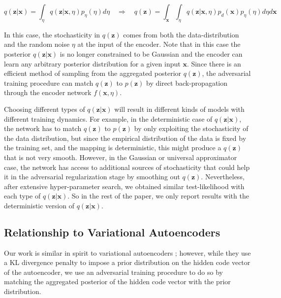 \documentclass{article}
\begin{document}
\vspace{-.2cm}

$$
q(\mathbf{z}|\mathbf{x}) = \int_\eta q(\mathbf{z}|\mathbf{x},\eta) p_{\eta}(\eta) d\eta \quad \Rightarrow  \quad q(\mathbf{z}) = \int_\mathbf{x} \int_\eta q(\mathbf{z}|\mathbf{x},\eta) p_d(\mathbf{x}) p_{\eta}(\eta) d\eta d\mathbf{x}
$$
\vspace{-.2cm}




In this case, the stochasticity in $q(\mathbf{z})$ comes from both the data-distribution and the random noise $\eta$ at the input of the encoder.
Note that in this case the posterior $q(\mathbf{z}|\mathbf{x})$ is no longer constrained to be Gaussian and the encoder can learn any arbitrary posterior distribution for a given input $\mathbf{x}$. Since there is an efficient method of sampling from the aggregated posterior $q(\mathbf{z})$, the adversarial training procedure can match $q(\mathbf{z})$ to $p(\mathbf{z})$ by direct back-propagation through the encoder network $f(\mathbf{x},\eta)$.

Choosing different types of $q(\mathbf{z}|\mathbf{x})$ will result in different kinds of models with different training dynamics. For example, in the deterministic case of $q(\mathbf{z}|\mathbf{x})$, the network has to match $q(\mathbf{z})$ to $p(\mathbf{z})$ by only exploiting the stochasticity of the data distribution, but since the empirical distribution of the data is fixed by the training set, and the mapping is deterministic, this might produce a $q(\mathbf{z})$ that is not very smooth. However, in the Gaussian or universal approximator case, the network has access to additional sources of stochasticity that could help it in the adversarial regularization stage by smoothing out $q(\mathbf{z})$. Nevertheless, after extensive hyper-parameter search, we obtained similar test-likelihood with each type of $q(\mathbf{z}|\mathbf{x})$. So in the rest of the paper, we only report results with the deterministic version of $q(\mathbf{z}|\mathbf{x})$.


\subsection{Relationship to Variational Autoencoders}

Our work is similar in spirit to variational autoencoders \citep{vae}; however, while they use a KL divergence penalty to impose a prior distribution on the hidden code vector of the autoencoder, we use an adversarial training procedure to do so by matching the aggregated posterior of the hidden code vector with the prior distribution.
\end{document}
